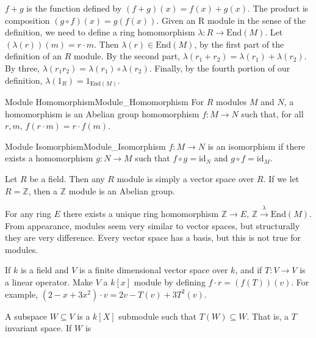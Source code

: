 \documentclass[crop=false,class=article]{standalone}                       %
\begin{document}
        $f+g$ is the function defined by $(f+g)(x)=f(x)+g(x)$. The product
        is composition $(g\circ{f})(x)=g(f(x))$.
        Given an R module in the sense of the definition, we need to define
        a ring homomorphism $\lambda:R\rightarrow\textrm{End}(M)$.
        Let $(\lambda(r))(m)=r\cdot{m}$. Then
        $\lambda(r)\in\textrm{End}(M)$,
        by the first part of the definition of an $R$ module. By the second
        part, $\lambda(r_{1}+r_{2})=\lambda(r_{1})+\lambda(r_{2})$. By
        three, $\lambda(r_{1}r_{2})=\lambda(r_{1})\circ\lambda(r_{2})$.
        Finally, by the fourth portion of our definition,
        $\lambda(1_{R})=1_{\textrm{End}(M)}$.
        \begin{ldefinition}{Module Homomorphism}{Module_Homomorphism}
            For $R$ modules $M$ and $N$, a homomorphism is an Abelian group
            homomorphism $f:M\rightarrow{N}$ such that, for all $r,m$,
            $f(r\cdot{m})=r\cdot{f}(m)$.
        \end{ldefinition}
        \begin{ldefinition}{Module Isomorphism}{Module_Isomorphism}
            $f:M\rightarrow{N}$ is an isomorphism if there exists a
            homomorphism $g:N\rightarrow{M}$ such that
            $f\circ{g}=\textrm{id}_{N}$ and $g\circ{f}=\textrm{id}_{M}$.
        \end{ldefinition}
        \begin{example}
            Let $R$ be a field. Then any $R$ module is simply a vector space
            over $R$. If we let $R=\mathbb{Z}$, then a $\mathbb{Z}$ module
            is an Abelian group.
        \end{example}
        For any ring $E$ there exists a unique ring homomorphism
        $\mathbb{Z}\rightarrow{E}$,
        $\mathbb{Z}\overset{\lambda}{\rightarrow}\textrm{End}(M)$.
        From appearance, modules seem very similar to vector spaces, but
        structurally they are very difference. Every vector space has a
        basis, but this is not true for modules.
        \begin{lexample}{}{}
            If $k$ is a field and $V$ is a finite dimensional vector space
            over $k$, and if $T:V\rightarrow{V}$ is a linear operator. Make
            $V$ a $k[x]$ module by defining $f\cdot{r}=(f(T))(v)$. For
            example, $(2-x+3x^2)\cdot{v}=2v-T(v)+3T^{2}(v)$.
        \end{lexample}
        A subspace $W\subseteq{V}$ is a $k[X]$ submodule such that
        $T(W)\subseteq{W}$. That is, a $T$ invariant space. If $W$ is
\end{document}
